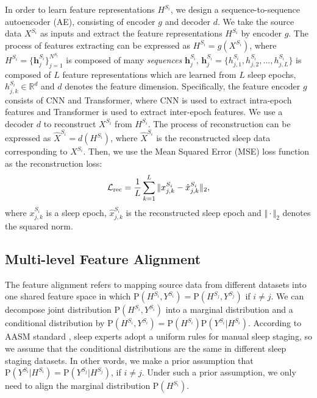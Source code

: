 \documentclass[letterpaper]{article} %
\begin{document}
	In order to learn feature representations $H^{S_i}$, we design a sequence-to-sequence autoencoder (AE), consisting of encoder $g$ and decoder $d$.
	We take the source data $X^{S_i}$ as inputs and extract the feature representations $H^{S_i}$ by encoder $g$.
	The process of features extracting can be expressed as $H^{S_i}=g(X^{S_i})$,
	where $H^{S_i} = \{\mathrm{\mathbf{h}}^{S_i}_j\}^{N^{S_i}}_{j=1}$ is composed of many \textit{sequences}  $\mathrm{\mathbf{h}}^{S_i}_j$, $\mathrm{\mathbf{h}}^{S_i}_j = \{h^{S_i}_{j, 1}, h^{S_i}_{j, 2}, ... , h^{S_i}_{j, L}\}$ is composed of $L$ feature representations which are learned from $L$ sleep epochs, $h^{S_i}_{j, k} \in \mathbb{R}^{d}$ and $d$ denotes the feature dimension.
	Specifically, the feature encoder $g$ consists of CNN and Transformer, where CNN is used to extract intra-epoch features and Transformer is used to extract inter-epoch features.
	We use a decoder $d$ to reconstruct $X^{S_i}$ from $H^{S_i}$.
	The process of reconstruction can be expressed as $\hat{X}^{S_i}=d(H^{S_i})$,
	where $\hat{X}^{S_i}$ is the reconstructed sleep data corresponding to $X^{S_i}$.
	Then, we use the Mean Squared Error (MSE) loss function as the reconstruction loss:
	\begin{equation}
		\label{predicting}
		\small
		\mathcal{L}_{\mathrm{rec}} = \frac{1}{L}\sum^{L}_{k=1} \Vert x^{S_i}_{j, k} - \hat{x}^{S_i}_{j, k} \Vert_2,
	\end{equation}
	where $x^{S_i}_{j, k}$ is a sleep epoch, $\hat{x}^{S_i}_{j, k}$ is the reconstructed sleep epoch and  $\Vert \cdot \Vert_2$ denotes the squared norm.

	\subsection{Multi-level Feature Alignment}
	The feature alignment refers to mapping source data from different datasets into one shared feature space in which $\mathrm{P}(H^{S_i}, Y^{S_i}) = \mathrm{P}(H^{S_j}, Y^{S_j})$ if $i \neq j$.
	We can decompose joint distribution $\mathrm{P}(H^{S_i}, Y^{S_i})$ into a marginal distribution and a conditional distribution by $\mathrm{P}(H^{S_i}, Y^{S_i}) = \mathrm{P}(H^{S_i})\mathrm{P}(Y^{S_i}|H^{S_i})$.
	According to AASM standard \citep{Iber2007TheAA}, sleep experts adopt a uniform rules for manual sleep staging, so we assume that the conditional distributions are the same in different sleep staging datasets.
	In other words, we make a prior assumption that $\mathrm{P}(Y^{S_i}|H^{S_i})=\mathrm{P}(Y^{S_j}|H^{S_j})$, if $i \neq j$.
	Under such a prior assumption, we only need to align the marginal distribution $\mathrm{P}(H^{S_i})$.
\end{document}

